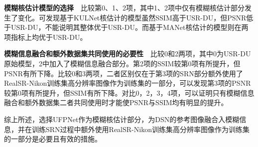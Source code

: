 \noindent\textbf{模糊核估计模型的选择}\ \ 比较第0、1、2项，其中1、2项中仅有模糊核估计部分发生了变化。可发现基于KULNet核估计的模型虽然SSIM高于USR-DU，但PSNR低于USR-DU，不能说明其整体优于USR-DU。而基于MANet核估计的模型则在两项指标上均优于USR-DU。

\noindent\textbf{模糊信息融合和额外数据集共同使用的必要性}\ \ 比较0和2两项，其中0为USR-DU原始模型，2中加入了模糊信息融合部分。第2项的SSIM较第0项有所提升，但PSNR有所下降。比较0和3两项，二者区别仅在于第3项的SRN部分额外使用了RealSR-Nikon训练集高分辨率图像作为训练集的一部分，可以发现第3项的PSNR较第0项有所提升，但SSIM有所下降。对比0，2，3，4项，可以证明只有模糊信息融合和额外数据集二者共同使用时才能使PSNR与SSIM均有明显的提升。

综上所述，选择UFPNet作为模糊核估计部分，为DSN的参考图像融合入模糊信息，并在训练SRN过程中额外使用RealSR-Nikon训练集高分辨率图像作为训练集的一部分是必要且有效的措施。

